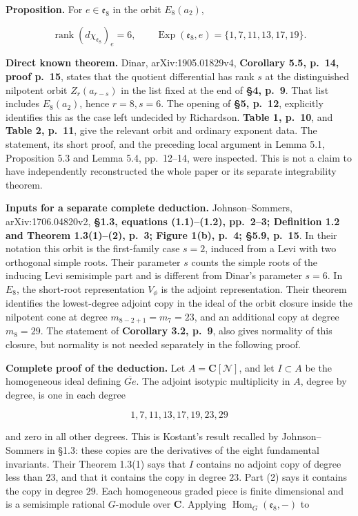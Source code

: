 \textbf{Proposition.} For \(e\in\mathfrak e_8\) in the orbit \(E_8(a_2)\),

\[
 \operatorname{rank}(d\chi_{\mathfrak e_8})_e=6,
 \qquad
 \operatorname{Exp}(\mathfrak e_8,e)=\{1,7,11,13,17,19\}.
 \tag{CC-RK.2}
\]

\textbf{Direct known theorem.} Dinar, arXiv:1905.01829v4, \textbf{Corollary 5.5, p.~14, proof p.~15}, states that the quotient differential has rank \(s\) at the distinguished nilpotent orbit \(Z_r(a_{r-s})\) in the list fixed at the end of \textbf{§4, p.~9}. That list includes \(E_8(a_2)\), hence \(r=8,s=6\). The opening of \textbf{§5, p.~12}, explicitly identifies this as the case left undecided by Richardson. \textbf{Table 1, p.~10}, and \textbf{Table 2, p.~11}, give the relevant orbit and ordinary exponent data. The statement, its short proof, and the preceding local argument in Lemma 5.1, Proposition 5.3 and Lemma 5.4, pp.~12--14, were inspected. This is not a claim to have independently reconstructed the whole paper or its separate integrability theorem.

\textbf{Inputs for a separate complete deduction.} Johnson--Sommers, arXiv:1706.04820v2, \textbf{§1.3, equations (1.1)--(1.2), pp.~2--3; Definition 1.2 and Theorem 1.3(1)--(2), p.~3; Figure 1(b), p.~4; §5.9, p.~15}. In their notation this orbit is the first-family case \(s=2\), induced from a Levi with two orthogonal simple roots. Their parameter \(s\) counts the simple roots of the inducing Levi semisimple part and is different from Dinar's parameter \(s=6\). In \(E_8\), the short-root representation \(V_\phi\) is the adjoint representation. Their theorem identifies the lowest-degree adjoint copy in the ideal of the orbit closure inside the nilpotent cone at degree \(m_{8-2+1}=m_7=23\), and an additional copy at degree \(m_8=29\). The statement of \textbf{Corollary 3.2, p.~9}, also gives normality of this closure, but normality is not needed separately in the following proof.

\textbf{Complete proof of the deduction.} Let \(A=\mathbf C[\mathcal N]\), and let \(I\subset A\) be the homogeneous ideal defining \(\overline{G e}\). The adjoint isotypic multiplicity in \(A\), degree by degree, is one in each degree

\[
 1,7,11,13,17,19,23,29
\]

and zero in all other degrees. This is Kostant's result recalled by Johnson--Sommers in §1.3: these copies are the derivatives of the eight fundamental invariants. Their Theorem 1.3(1) says that \(I\) contains no adjoint copy of degree less than \(23\), and that it contains the copy in degree \(23\). Part (2) says it contains the copy in degree \(29\). Each homogeneous graded piece is finite dimensional and is a semisimple rational \(G\)-module over \(\mathbf C\). Applying \(\operatorname{Hom}_G(\mathfrak e_8,-)\) to

